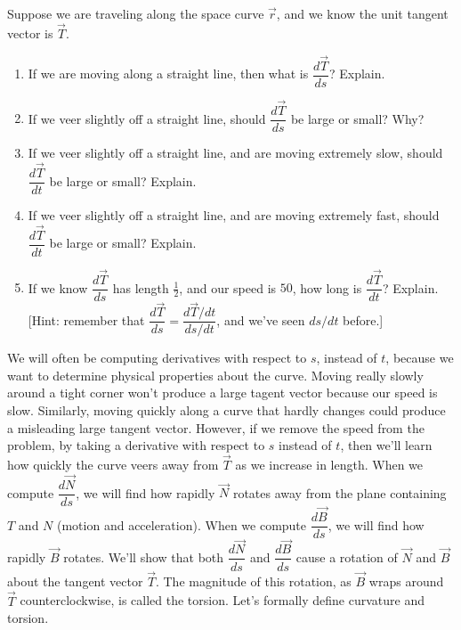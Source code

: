 \begin{problem}%
Suppose we are traveling along the space curve $\vec r$, and we know the unit tangent vector is $\vec T$. 
\begin{enumerate}
 \item If we are moving along a straight line, then what is $\dfrac{d\vec T}{ds}$? Explain.
 \item If we veer slightly off a straight line, should $\dfrac{d\vec T}{ds}$ be large or small? Why?
 \item If we veer slightly off a straight line, and are moving extremely slow, should $\dfrac{d\vec T}{dt}$ be large or small? Explain.
 \item If we veer slightly off a straight line, and are moving extremely fast, should $\dfrac{d\vec T}{dt}$ be large or small? Explain.
 \item If we know $\dfrac{d\vec T}{ds}$ has length $\frac{1}{2}$, and our speed is $50$, how long is $\dfrac{d\vec T}{dt}$? Explain. [Hint: remember that $\dfrac{d\vec T}{ds} = \dfrac{d\vec T/dt}{ds/dt}$, and we've seen $ds/dt$ before.]
\end{enumerate}
\end{problem}

We will often be computing derivatives with respect to $s$, instead of $t$, because we want to determine physical properties about the curve. Moving really slowly around a tight corner won't produce a large tagent vector because our speed is slow.  Similarly, moving quickly along a curve that hardly changes could produce a misleading large tangent vector.  However, if we remove the speed from the problem, by taking a derivative with respect to $s$ instead of $t$, then we'll learn how quickly the curve veers away from $\vec T$ as we increase in length.  
When we compute $\dfrac{d\vec N}{ds}$, we will find how rapidly $\vec N$ rotates away from the plane containing $T$ and $N$ (motion and acceleration). 
When we compute $\dfrac{d\vec B}{ds}$, we will find how rapidly $\vec B$ rotates.  We'll show that both $\dfrac{d\vec N}{ds}$ and $\dfrac{d\vec B}{ds}$ cause a rotation of $\vec N$ and $\vec B$ about the tangent vector $\vec T$. The magnitude of this rotation, as $\vec B$ wraps around $\vec T$ counterclockwise, is called the torsion. Let's formally define curvature and torsion.

